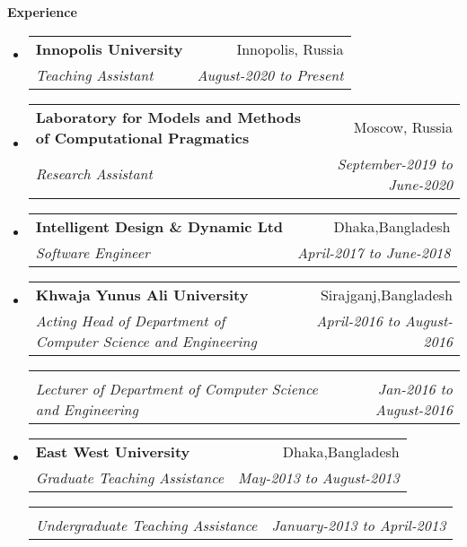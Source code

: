 \documentclass[letterpaper,10pt]{article}
\makeatletter
\newcommand{\resitem}[1]{\item #1 \vspace{-2pt}}
\newcommand{\resheading}[1]{{\large \colorbox{mygrey}{\begin{minipage}{\textwidth}{\textbf{#1 \vphantom{p\^{E}}}}\end{minipage}}}}
\newcommand{\ressubheading}[4]{
\begin{tabular*}{6.5in}{l@{\extracolsep{\fill}}r}
		\textbf{#1} & #2 \\
		\textit{#3} & \textit{#4} \\
\end{tabular*}\vspace{-6pt}}
\makeatother
\begin{document}
\vspace{0.1in}




\vspace{0.1in}
\resheading{Experience}
\begin{itemize}


\item

\ressubheading{Innopolis University}{Innopolis, Russia}{Teaching Assistant}{August-2020 to Present}
\item

\ressubheading{Laboratory for Models and Methods of Computational Pragmatics}{Moscow, Russia}{Research Assistant}{September-2019 to June-2020}

\item

\ressubheading{Intelligent Design \& Dynamic Ltd}{Dhaka,Bangladesh}{Software Engineer}{April-2017 to June-2018}
\item
\ressubheading{Khwaja Yunus Ali University}{Sirajganj,Bangladesh}{Acting Head of Department of Computer Science and Engineering}{April-2016 to August-2016}
\ressubheading{ }{}{Lecturer of Department of Computer Science and Engineering}{Jan-2016 to August-2016 }
\item
	\ressubheading{East West University}{Dhaka,Bangladesh}{Graduate Teaching Assistance }{May-2013 to August-2013 }
\ressubheading{}{}{Undergraduate Teaching Assistance}{January-2013 to April-2013}	
\end{itemize}
\end{document}
